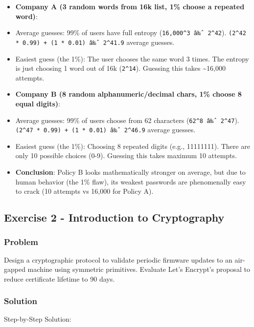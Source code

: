 \documentclass{article}
\begin{document}
\begin{itemize}
    \item \textbf{Company A (3 random words from 16k list, 1\% choose a repeated word)}:
    \item Average guesses: 99\% of users have full entropy (\texttt{16,000\textasciicircum{}3 â‰ˆ 2\textasciicircum{}42}). \texttt{(2\textasciicircum{}42 * 0.99) + (1 * 0.01) â‰ˆ 2\textasciicircum{}41.9} average guesses.
    \item Easiest guess (the 1\%): The user chooses the same word 3 times. The entropy is just choosing 1 word out of 16k (\texttt{2\textasciicircum{}14}). Guessing this takes \textasciitilde{}16,000 attempts.
    \item \textbf{Company B (8 random alphanumeric/decimal chars, 1\% choose 8 equal digits)}:
    \item Average guesses: 99\% of users choose from 62 characters (\texttt{62\textasciicircum{}8 â‰ˆ 2\textasciicircum{}47}). \texttt{(2\textasciicircum{}47 * 0.99) + (1 * 0.01) â‰ˆ 2\textasciicircum{}46.9} average guesses.
    \item Easiest guess (the 1\%): Choosing 8 repeated digits (e.g., 11111111). There are only 10 possible choices (0-9). Guessing this takes maximum 10 attempts.
    \item \textbf{Conclusion}: Policy B looks mathematically stronger on average, but due to human behavior (the 1\% flaw), its weakest passwords are phenomenally easy to crack (10 attempts vs 16,000 for Policy A).
\end{itemize}

\subsection{Exercise 2 - Introduction to Cryptography}
\subsubsection*{Problem}
Design a cryptographic protocol to validate periodic firmware updates to an air-gapped machine using symmetric primitives. Evaluate Let's Encrypt's proposal to reduce certificate lifetime to 90 days.

\subsubsection*{Solution}
Step-by-Step Solution:
\end{document}
